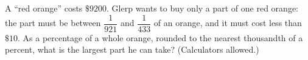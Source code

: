 A ``red orange'' costs $\$9200$. Glerp wants to buy only a part of one red orange: the part must be between $\dfrac1{921}$ and $\dfrac1{433}$ of an orange, and it must cost less than $\$10$. As a percentage of a whole orange, rounded to the nearest thousandth of a percent, what is the largest part he can take? (Calculators allowed.)
